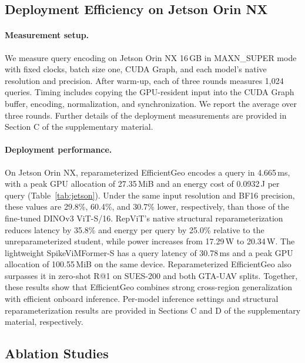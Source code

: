 \subsection{Deployment Efficiency on Jetson Orin NX}
\label{sec:deployment_efficiency}
\paragraph{Measurement setup.}
We measure query encoding on Jetson Orin NX 16\,GB in MAXN\_SUPER mode with fixed clocks, batch size one, CUDA Graph, and each model's native resolution and precision. After warm-up, each of three rounds measures 1,024 queries. Timing includes copying the GPU-resident input into the CUDA Graph buffer, encoding, normalization, and synchronization. We report the average over three rounds. Further details of the deployment measurements are provided in Section C of the supplementary material.

\paragraph{Deployment performance.}On Jetson Orin NX, reparameterized EfficientGeo encodes a query in 4.665\,ms, with a peak GPU allocation of 27.35\,MiB and an energy cost of 0.0932\,J per query (Table~\ref{tab:jetson}). Under the same input resolution and BF16 precision, these values are 29.8\%, 60.4\%, and 30.7\% lower, respectively, than those of the fine-tuned DINOv3 ViT-S/16. RepViT's native structural reparameterization~\cite{wang2024repvit} reduces latency by 35.8\% and energy per query by 25.0\% relative to the unreparameterized student, while power increases from 17.29\,W to 20.34\,W. The lightweight SpikeViMFormer-S has a query latency of 30.78\,ms and a peak GPU allocation of 100.55\,MiB on the same device. Reparameterized EfficientGeo also surpasses it in zero-shot R@1 on SUES-200 and both GTA-UAV splits. Together, these results show that EfficientGeo combines strong cross-region generalization with efficient onboard inference. Per-model inference settings and structural reparameterization results are provided in Sections C and D of the supplementary material, respectively.

\subsection{Ablation Studies}
\label{sec:ablations}
\begin{table}[!b]

\end{table}
